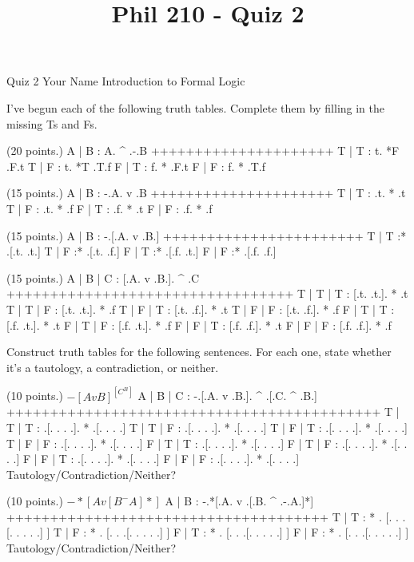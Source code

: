
\title{Phil 210 - Quiz 2}

\heading
Quiz 2
Your Name
Introduction to Formal Logic
\endheading

I've begun each of the following truth tables. Complete them by filling in the missing Ts and Fs.

\problems
{} (20 points.)
\truthtable
 A | B : A.  ^  .-.B
+++++++++++++++++++++
 T | T : t. *F  .F.t
 T | F : t. *T  .T.f
 F | T : f. *   .F.t
 F | F : f. *   .T.f
\endtruthtable

 (15 points.)
\truthtable
 A | B : -.A.  v  .B
+++++++++++++++++++++
 T | T :  .t. *   .t
 T | F :  .t. *   .f
 F | T :  .f. *   .t
 F | F :  .f. *   .f
\endtruthtable

 (15 points.)
\truthtable
 A | B : -.[.A. v .B.]
+++++++++++++++++++++++
 T | T :* .[.t.   .t.]
 T | F :* .[.t.   .f.]
 F | T :* .[.f.   .t.]
 F | F :* .[.f.   .f.]
\endtruthtable

 (15 points.)
\truthtable
 A | B | C : [.A. v .B.].  ^  .C
+++++++++++++++++++++++++++++++++
 T | T | T : [.t.   .t.]. *   .t
 T | T | F : [.t.   .t.]. *   .f
 T | F | T : [.t.   .f.]. *   .t
 T | F | F : [.t.   .f.]. *   .f
 F | T | T : [.f.   .t.]. *   .t
 F | T | F : [.f.   .t.]. *   .f
 F | F | T : [.f.   .f.]. *   .t
 F | F | F : [.f.   .f.]. *   .f
\endtruthtable

\endproblems

Construct truth tables for the following sentences. For each one, state whether it's a tautology, a contradiction, or neither.

\problems
{} (10 points.)
$ -[A v B] ^ [C ^ B] $
        \answer
        \truthtable
         A | B | C : -.[.A. v .B.].  ^  .[.C. ^ .B.]
        +++++++++++++++++++++++++++++++++++++++++++
         T | T | T :  .[. .   . .]. *   .[. .   . .]
         T | T | F :  .[. .   . .]. *   .[. .   . .]
         T | F | T :  .[. .   . .]. *   .[. .   . .]
         T | F | F :  .[. .   . .]. *   .[. .   . .]
         F | T | T :  .[. .   . .]. *   .[. .   . .]
         F | T | F :  .[. .   . .]. *   .[. .   . .]
         F | F | T :  .[. .   . .]. *   .[. .   . .]
         F | F | F :  .[. .   . .]. *   .[. .   . .]
        \endtruthtable
        Tautology/Contradiction/Neither?
        \endanswer

 (10 points.)
$ -*[A v [B ^ -A]*] $
        \answer
        \truthtable
         A | B :  -.*[.A. v .[.B. ^ .-.A.]*]
        +++++++++++++++++++++++++++++++++++++
         T | T : * . [. .   .[. .   . . .] ]
         T | F : * . [. .   .[. .   . . .] ]
         F | T : * . [. .   .[. .   . . .] ]
         F | F : * . [. .   .[. .   . . .] ]
        \endtruthtable
        Tautology/Contradiction/Neither?
        \endanswer

